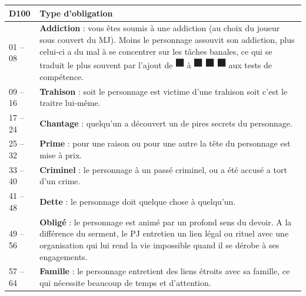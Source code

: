 \documentclass[twoside]{article}
\begin{document}
\renewcommand{\arraystretch}{1.4}
\begin{center}
	\begin{tabular}{|p{4.5cm}|p{12cm}|}
		\hline 
		\cellcolor{DarkRed} {\large \textcolor{PureWhite}{\textbf{D100}}} & \cellcolor{DarkRed} {\large \textcolor{PureWhite}{\textbf{Type d'obligation}}} \\
		\hline 
		01 -- 08 & \textbf{Addiction} : vous êtes soumis à une addiction (au choix du joueur sous couvert du MJ). Moins le personnage assouvit son addiction, plus celui-ci a du mal à se concentrer sur les tâches banales, ce qui se traduit le plus souvent par l'ajout de {\Large \includegraphics[height=\fontcharht\font`\B]{../img/dice_black}} à {\Large \includegraphics[height=\fontcharht\font`\B]{../img/dice_black}} {\Large \includegraphics[height=\fontcharht\font`\B]{../img/dice_black}} {\Large \includegraphics[height=\fontcharht\font`\B]{../img/dice_black}} aux tests de compétence. \\
		\hline 
		09 -- 16 & \textbf{Trahison} : soit le personnage est victime d'une trahison soit c'est le traitre lui-même. \\
		\hline 
		17 -- 24 & \textbf{Chantage} : quelqu'un a découvert un de pires secrets du personnage. \\
		\hline 
		25 -- 32 & \textbf{Prime} : pour une raison ou pour une autre la tête du personnage est mise à prix. \\
		\hline 
		33 -- 40 & \textbf{Criminel} : le personnage à un passé criminel, ou a été accusé a tort d'un crime. \\
		\hline 
		41 -- 48 & \textbf{Dette} : le personnage doit quelque chose à quelqu'un. \\
		\hline 
		49 -- 56 & \textbf{Obligé} : le personnage est animé par un profond sens du devoir. A la différence du serment, le PJ entretien un lien légal ou rituel avec une organisation qui lui rend la vie impossible quand il se dérobe à ses engagements. \\
		\hline 
		57 -- 64 & \textbf{Famille} : le personnage entretient des liens étroits avec sa famille, ce qui nécessite beaucoup de temps et d'attention. \\

\end{tabular}
\end{center}
\end{document}
